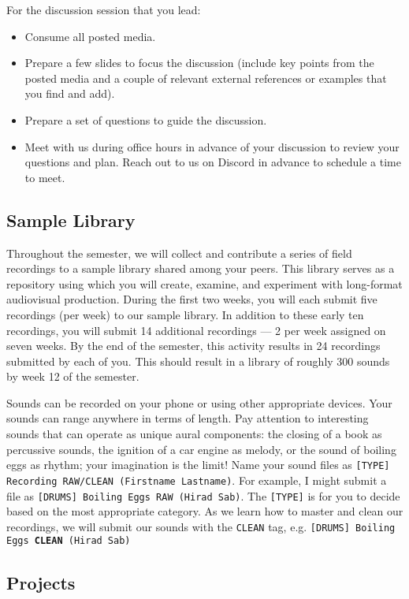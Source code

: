 For the discussion session that you lead:
\begin{itemize}
      \tightlist
      \item Consume all posted media.
      \item Prepare a few slides to focus the discussion (include key points from the posted media and a couple of relevant external references or examples that you find and add).
      \item Prepare a set of questions to guide the discussion.
      \item Meet with us during office hours in advance of your discussion to review your questions and plan. Reach out to us on Discord in advance to schedule a time to meet.
\end{itemize}

\subsection{Sample Library}

Throughout the semester, we will collect and contribute a series of field recordings to a sample library shared among your peers. This library serves as a repository using which you will create, examine, and experiment with long-format audiovisual production. During the first two weeks, you will each submit five recordings (per week) to our sample library. In addition to these early ten recordings, you will submit 14 additional recordings --- 2 per week assigned on seven weeks. By the end of the semester, this activity results in 24 recordings submitted by each of you. This should result in a library of roughly 300 sounds by week 12 of the semester.

Sounds can be recorded on your phone or using other appropriate devices. Your sounds can range anywhere in terms of length. Pay attention to interesting sounds that can operate as unique aural components: the closing of a book as percussive sounds, the ignition of a car engine as melody, or the sound of boiling eggs as rhythm; your imagination is the limit! Name your sound files as \texttt{[TYPE] Recording RAW/CLEAN (Firstname Lastname)}. For example, I might submit a file as \texttt{[DRUMS] Boiling Eggs RAW (Hirad Sab)}. The \texttt{[TYPE]} is for you to decide based on the most appropriate category. As we learn how to master and clean our recordings, we will submit our sounds with the \texttt{CLEAN} tag, e.g. \texttt{[DRUMS] Boiling Eggs \textbf{CLEAN} (Hirad Sab)}

\subsection{Projects}

